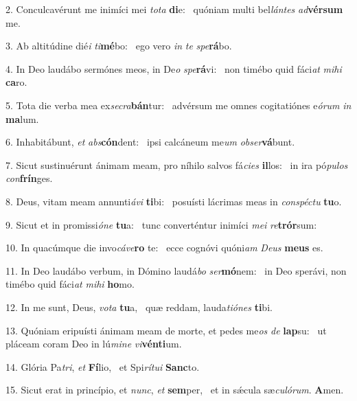 2. Conculcavérunt me inimíci mei \textit{to}\textit{ta} \textbf{di}e: \ast\  quóniam multi bel\textit{lán}\textit{tes} \textit{ad}\textbf{vér}\textbf{sum} me.\

3. Ab altitúdine dié\textit{i} \textit{ti}\textbf{mé}bo: \ast\  ego vero \textit{in} \textit{te} \textit{spe}\textbf{rá}bo.\

4. In Deo laudábo sermónes meos, in De\textit{o} \textit{spe}\textbf{rá}vi: \ast\  non timébo quid fáci\textit{at} \textit{mi}\textit{hi} \textbf{ca}ro.\

5. Tota die verba mea ex\textit{se}\textit{cra}\textbf{bán}tur: \ast\  advérsum me omnes cogitatiónes e\textit{ó}\textit{rum} \textit{in} \textbf{ma}lum.\

6. Inhabitábunt, \textit{et} \textit{abs}\textbf{cón}dent: \ast\  ipsi calcáneum me\textit{um} \textit{ob}\textit{ser}\textbf{vá}bunt.\

7. Sicut sustinuérunt ánimam meam, pro níhilo salvos fá\textit{ci}\textit{es} \textbf{il}los: \ast\  in ira pó\textit{pu}\textit{los} \textit{con}\textbf{frín}ges.\

8. Deus, vitam meam annunti\textit{á}\textit{vi} \textbf{ti}bi: \ast\  posuísti lácrimas meas in \textit{con}\textit{spéc}\textit{tu} \textbf{tu}o.\

9. Sicut et in promissi\textit{ó}\textit{ne} \textbf{tu}a: \ast\  tunc converténtur inimíci \textit{me}\textit{i} \textit{re}\textbf{trór}sum:\

10. In quacúmque die invo\textit{cá}\textit{ve}\textbf{ro} te: \ast\  ecce cognóvi quóni\textit{am} \textit{De}\textit{us} \textbf{me}\textbf{us} es.\

11. In Deo laudábo verbum, in Dómino laudá\textit{bo} \textit{ser}\textbf{mó}nem: \ast\  in Deo sperávi, non timébo quid fáci\textit{at} \textit{mi}\textit{hi} \textbf{ho}mo.\

12. In me sunt, Deus, \textit{vo}\textit{ta} \textbf{tu}a, \ast\  quæ reddam, lauda\textit{ti}\textit{ó}\textit{nes} \textbf{ti}bi.\

13. Quóniam eripuísti ánimam meam de morte, et pedes me\textit{os} \textit{de} \textbf{lap}su: \ast\  ut pláceam coram Deo in lú\textit{mi}\textit{ne} \textit{vi}\textbf{vén}\textbf{ti}um.\

14. Glória Pa\textit{tri}, \textit{et} \textbf{Fí}lio, \ast\  et Spi\textit{rí}\textit{tu}\textit{i} \textbf{Sanc}to.\

15. Sicut erat in princípio, et \textit{nunc}, \textit{et} \textbf{sem}per, \ast\  et in sǽcula sæ\textit{cu}\textit{ló}\textit{rum}. \textbf{A}men.\

